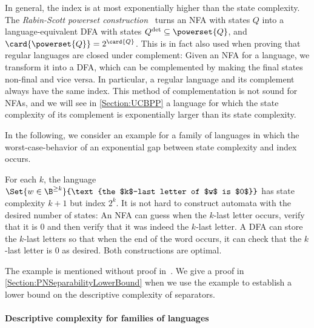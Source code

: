 \documentclass[../../diss.tex]{subfiles}
\begin{document}
In general, the index is at most exponentially higher than the state complexity.
The \emph{Rabin-Scott powerset construction}~\cite{RabinS59} turns an NFA with states $Q$ into a language-equivalent DFA with states $Q^{\det} \subseteq \powerset{Q}$, and $\card{\powerset{Q}} = 2^{\card{Q}}$.
This is in fact also used when proving that regular languages are closed under complement: Given an NFA for a language, we transform it into a DFA, which can be complemented by making the final states non-final and vice versa.
In particular, a regular language and its complement always have the same index.
This method of complementation is not sound for NFAs, and we will see in \cref{Section:UCBPP} a language for which the state complexity of its complement is exponentially larger than its state complexity.

In the following, we consider an example for a family of languages in which the worst-case-behavior of an exponential gap between state complexity and index occurs.

\begin{example}%
\label{Example:StateComplexityVsIndex}%
    For each $k$, the language $\Set{ w \in \B^{\geq k}}{\text{the $k$-last letter of $w$ is $0$}}$ has state complexity $k+1$ but index $2^k$.
    It is not hard to construct automata with the desired number of states:
    An NFA can guess when the $k$-last letter occurs, verify that it is $0$ and then verify that it was indeed the $k$-last letter.
    A DFA can store the $k$-last letters so that when the end of the word occurs, it can check that the $k$-last letter is $0$ as desired.
    Both constructions are optimal.

    The example is mentioned without proof in~\cite{Kozen97}.
    We give a proof in \cref{Section:PNSeparabilityLowerBound} when we use the example to establish a lower bound on the descriptive complexity of separators.
\end{example}

\paragraph{Descriptive complexity for families of languages}
\end{document}
